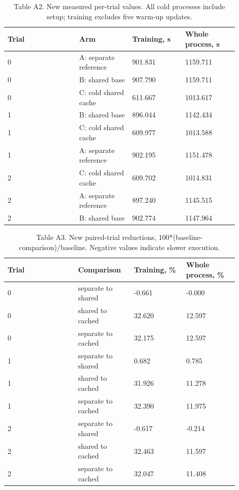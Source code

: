 \documentclass[10pt]{article}
\begin{document}
\begin{table}[htbp]\centering\footnotesize\caption{Table A2. New measured per-trial values. All cold processes include setup; training excludes five warm-up updates.}
\begin{tabular}{p{0.279\linewidth}p{0.207\linewidth}p{0.207\linewidth}p{0.207\linewidth}}
\toprule
Trial & Arm & Training, s & Whole process, s \\ \midrule
0 & A: separate reference & 901.831 & 1159.711 \\
0 & B: shared base & 907.790 & 1159.711 \\
0 & C: cold shared cache & 611.667 & 1013.617 \\
1 & B: shared base & 896.044 & 1142.434 \\
1 & C: cold shared cache & 609.977 & 1013.588 \\
1 & A: separate reference & 902.195 & 1151.478 \\
2 & C: cold shared cache & 609.702 & 1014.831 \\
2 & A: separate reference & 897.240 & 1145.515 \\
2 & B: shared base & 902.774 & 1147.964 \\
\bottomrule\end{tabular}\end{table}

\begin{table}[htbp]\centering\footnotesize\caption{Table A3. New paired-trial reductions, 100*(baseline-comparison)/baseline. Negative values indicate slower execution.}
\begin{tabular}{p{0.279\linewidth}p{0.207\linewidth}p{0.207\linewidth}p{0.207\linewidth}}
\toprule
Trial & Comparison & Training, \% & Whole process, \% \\ \midrule
0 & separate to shared & -0.661 & -0.000 \\
0 & shared to cached & 32.620 & 12.597 \\
0 & separate to cached & 32.175 & 12.597 \\
1 & separate to shared & 0.682 & 0.785 \\
1 & shared to cached & 31.926 & 11.278 \\
1 & separate to cached & 32.390 & 11.975 \\
2 & separate to shared & -0.617 & -0.214 \\
2 & shared to cached & 32.463 & 11.597 \\
2 & separate to cached & 32.047 & 11.408 \\
\bottomrule\end{tabular}\end{table}
\end{document}
